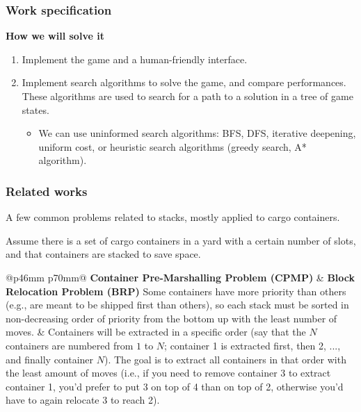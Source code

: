 \documentclass{beamer}
\def\\{}
\begin{document}
\begin{frame}
\frametitle{Work specification}
\textbf{How we will solve it}

\begin{enumerate}
  \itemsep0em
  \item Implement the game and a human-friendly interface.
  \item Implement search algorithms to solve the game, and compare performances. These algorithms are used to search for a path to a solution in a tree of game states.

  \begin{itemize}
    \itemsep0em
    \item We can use uninformed search algorithms: BFS, DFS, iterative deepening, uniform cost, or heuristic search algorithms (greedy search, A* algorithm).
  \end{itemize}
\end{enumerate}

\end{frame}

\begin{frame}
\frametitle{Related works}

A few common problems related to stacks, mostly applied to cargo containers.

Assume there is a set of cargo containers in a yard with a certain number of slots, and that containers are stacked to save space.

\vspace{0.5em}

\begin{tabular}{@{}p{46mm} p{70mm}@{}}
  \textbf{Container Pre-Marshalling Problem (CPMP)} & \textbf{Block Relocation Problem (BRP)} \\
  Some containers have more priority than others (e.g., are meant to be shipped first than others), so each stack must be sorted in non-decreasing order of priority from the bottom up with the least number of moves. &
  Containers will be extracted in a specific order (say that the $N$ containers are numbered from $1$ to $N$; container 1 is extracted first, then 2, ..., and finally container $N$). The goal is to extract all containers in that order with the least amount of moves (i.e., if you need to remove container 3 to extract container 1, you'd prefer to put 3 on top of 4 than on top of 2, otherwise you'd have to again relocate 3 to reach 2).
\end{tabular}

\end{frame}
\end{document}
